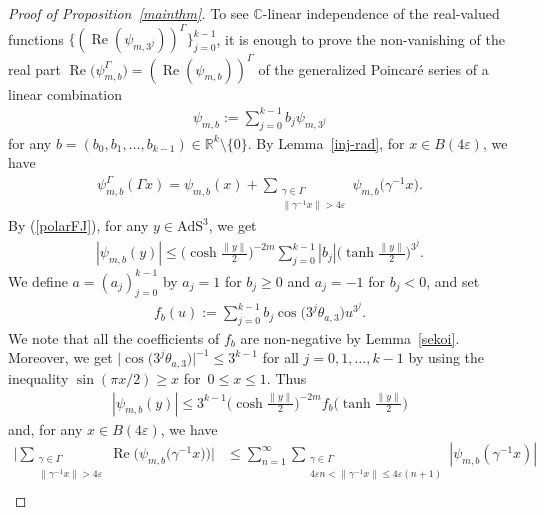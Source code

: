 \documentclass[10pt,a4paper]{amsart}
\numberwithin{equation}{section}
\begin{document}
\begin{proof}[Proof of Proposition~\ref{mainthm}]
To see $\mathbb{C}$-linear independence of the real-valued functions
$\big\{(\operatorname{Re}(\psi_{m,3^{j}}))^{\Gamma}\big\}_{j=0}^{k-1}$,
it is enough to prove the non-vanishing of
the real part $\operatorname{Re}\big(\psi_{m,b}^{\Gamma}\big)
=(\operatorname{Re}(\psi_{m,b}))^{\Gamma}$ of
the generalized Poincar\'e series of a linear combination
\begin{gather*}
\psi_{m,b} := \sum_{j = 0}^{k-1} b_j\psi_{m,3^{j}}
\end{gather*}
for any
$b=(b_{0},b_{1},\ldots,b_{k-1}) \in \mathbb{R}^{k}\setminus\{0\}$.
By Lemma~\ref{inj-rad}, for $x\in B(4\varepsilon)$, we have
\begin{gather}
\label{separate}
\psi_{m,b}^{\Gamma}(\Gamma x)
= \psi_{m,b}(x) + \sum_{\substack{\gamma \in \Gamma \\
\|\gamma^{-1} x\| > 4\varepsilon}} \psi_{m,b}\big(\gamma^{-1} x\big).
\end{gather}
By (\ref{polarFJ}), for any $y \in \mathrm{AdS}^{3}$, we get
\begin{gather*}
|\psi_{m,b}(y)| \leq \bigg( \!\cosh \frac{\| y \|}{2} \bigg)^{-2m}
\sum_{j=0}^{k-1} |b_{j}|\bigg(\! \tanh \frac{\| y \|}{2} \bigg)^{3^{j}}.
\end{gather*}
We define
$a=(a_{j})_{j=0}^{k-1}$ by $a_{j}=1$ for $b_{j}\geq 0$ and
$a_{j}=-1$ for $b_{j}<0$,
and set
\begin{gather*}
f_{b}(u) := \sum_{j=0}^{k-1} b_{j}\cos\big(3^{j}\theta_{a,3}\big)u^{3^{j}}.
\end{gather*}
We note that all the coefficients of $f_{b}$ are non-negative by Lemma~\ref{sekoi}.
Moreover, we get
$\big| \cos \big(3^{j}\theta_{a,3}\big) \big|^{-1}
\leq 3^{k-1}$ for all $j=0,1,\ldots,k-1$
by using the inequality $\sin(\pi x/2)\geq x$ for~$0\leq x\leq1$.
Thus
\begin{gather*}
|\psi_{m,b}(y)| \leq 3^{k-1}\bigg(\!\cosh \frac{\| y \|}{2} \bigg)^{-2m}
f_{b}\bigg(\! \tanh \frac{\| y \|}{2} \bigg)
\end{gather*}
and, for any $x\in B(4\varepsilon)$, we have
\begin{align}
\bigg|\!\!\!\sum_{\substack{\gamma \in \Gamma \\ \|\gamma^{-1} x\| > 4\varepsilon}} \operatorname{Re}\big(\psi_{m,b}\big(\gamma^{-1} x\big)\big)\bigg|
&\leq \sum_{n = 1}^{\infty} \sum_{\substack{\gamma \in \Gamma \\
4\varepsilon n < \|\gamma^{-1} x\| \leq 4\varepsilon (n + 1) }}
|\psi_{m,b}(\gamma^{-1} x)| \nonumber \\

\end{align}
\end{proof}
\end{document}
